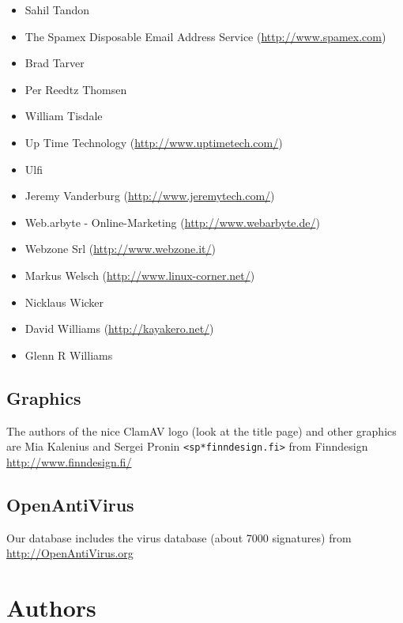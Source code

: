 \documentclass[a4paper,titlepage,12pt]{article}
\newcommand{\email}[1]{\texttt{#1}}
\begin{document}
\begin{itemize}
	\item Sahil Tandon
	\item The Spamex Disposable Email Address Service (\url{http://www.spamex.com})
	\item Brad Tarver
	\item Per Reedtz Thomsen
	\item William Tisdale
	\item Up Time Technology (\url{http://www.uptimetech.com/})
	\item Ulfi
	\item Jeremy Vanderburg (\url{http://www.jeremytech.com/})
	\item Web.arbyte - Online-Marketing (\url{http://www.webarbyte.de/})
	\item Webzone Srl (\url{http://www.webzone.it/})
	\item Markus Welsch (\url{http://www.linux-corner.net/})
	\item Nicklaus Wicker
	\item David Williams (\url{http://kayakero.net/})
	\item Glenn R Williams
    \end{itemize}

    \subsection{Graphics}
    The authors of the nice ClamAV logo (look at the title page) and other
    graphics are Mia Kalenius and Sergei Pronin \email{<sp*finndesign.fi>}
    from Finndesign \url{http://www.finndesign.fi/}

    \subsection{OpenAntiVirus}
    Our database includes the virus database (about 7000 signatures) from\\
    \url{http://OpenAntiVirus.org}

    \section{Authors}
\end{document}
